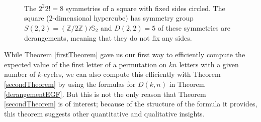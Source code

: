 \begin{example}
\begin{figure}[!ht]
\begin{tikzpicture}
    \end{tikzpicture}
    ~
    ~
    ~
    \caption[Facet derangements of a square.]{
      The $2^{2}2! = 8$ symmetries of a square with fixed sides circled.
      The square ($2$-dimensional hypercube) has symmetry group
      $S(2,2) = (\mathbb{Z}/2\mathbb{Z}) \wr \mathbb S_2$ and $D(2,2) = 5$ of these
      symmetries are derangements, meaning that they do not fix any sides.
    }
    \label{fig:squareDerangements}
  \end{figure}
\end{example}

While Theorem \ref{firstTheorem} gave us our first way to efficiently compute
the expected value of the first letter of a permutation on $kn$ letters with
a given number of $k$-cycles, we can also compute this efficiently with
Theorem \ref{secondTheorem} by using the formulas for $D(k,n)$ in Theorem \ref{derangementEGF}.
But this is not the only reason that Theorem \ref{secondTheorem} is of interest;
because of the structure of the formula it provides, this theorem suggests other
quantitative and qualitative insights.

